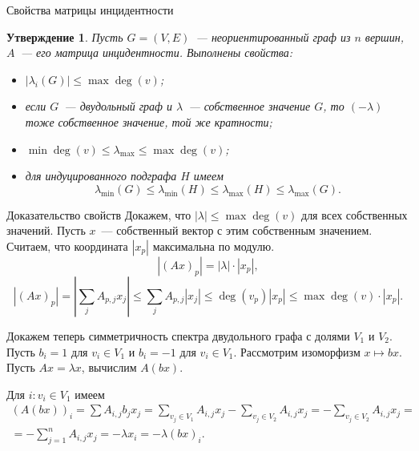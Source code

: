 \documentclass{beamer}
\renewcommand\le{\leqslant}
\newcommand\R{\mathbb R}
\newtheorem*{statement}{Утверждение}
\begin{document}
\begin{frame}{Свойства матрицы инцидентности}
    \begin{statement}
        Пусть $G=(V,E)$~--- неориентированный граф из $n$ вершин, $A$~--- его
        матрица инцидентности. Выполнены свойства:\pause
        \begin{itemize}
            \item $|\lambda_i(G)|\le \max\deg(v)$; \pause
            \item если $G$~--- двудольный граф и $\lambda$~--- собственное
                значение $G$, то $(-\lambda)$ тоже собственное значение, той
                же кратности; \pause
            \item $\min\deg(v)\le \lambda_{\max} \le \max\deg(v)$; \pause
            \item для индуцированного подграфа $H$ имеем
                $$
                \lambda_{\min}(G)\le\lambda_{\min}(H)\le\lambda_{\max}(H)\le\lambda_{\max}(G).
                $$
        \end{itemize}
    \end{statement}

\end{frame}

\begin{frame}{Доказательство свойств}
    Докажем, что $|\lambda|\le \max\deg(v)$ для всех собственных значений. Пусть
    $x$~--- собственный вектор с этим собственным значением. Считаем, что
    координата $|x_p|$ максимальна по модулю.\pause
    $$
    |(Ax)_p| = |\lambda| \cdot |x_p|,
    $$
    $$
    |(Ax)_p| = |\sum_j A_{p,j}x_j| \le \sum_j A_{p,j}|x_j| \le \deg(v_p)|x_p|
    \le \max\deg(v)\cdot |x_p|.
    $$
    \pause\vspace{5pt}

    Докажем теперь симметричность спектра двудольного графа с долями $V_1$ и
    $V_2$. Пусть $b_i=1$ для $v_i\in V_1$ и $b_i=-1$ для $v_i\in V_1$.
    Рассмотрим изоморфизм $x\mapsto bx$. Пусть $Ax=\lambda x$, вычислим $A(bx)$.
    \pause\vspace{5pt}

    Для $i\colon v_i\in V_1$ имеем
    \begin{multline*}
    (A(bx))_i = \sum A_{i,j}b_jx_j = \sum_{v_j\in V_1} A_{i,j}x_j - \sum_{v_j\in
    V_2} A_{i,j}x_j = -\sum_{v_j\in V_2}A_{i,j}x_j = \\
    = -\sum_{j=1}^n A_{i,j}x_j = -\lambda x_i = -\lambda (bx)_i.
    \end{multline*}
\end{frame}
\end{document}
